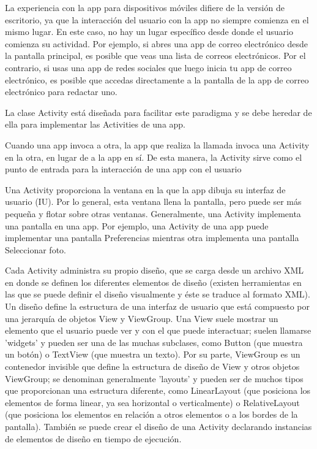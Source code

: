 La experiencia con la app para dispositivos móviles difiere de la versión de escritorio, ya que la interacción del usuario con la app no siempre comienza en el mismo lugar. En este caso, no hay un lugar específico desde donde el usuario comienza su actividad. Por ejemplo, si abres una app de correo electrónico desde la pantalla principal, es posible que veas una lista de correos electrónicos. Por el contrario, si usas una app de redes sociales que luego inicia tu app de correo electrónico, es posible que accedas directamente a la pantalla de la app de correo electrónico para redactar uno.

La clase Activity está diseñada para facilitar este paradigma y se debe heredar de ella para implementar las Activities de una app. 

Cuando una app invoca a otra, la app que realiza la llamada invoca una Activity en la otra, en lugar de a la app en sí. De esta manera, la Activity sirve como el punto de entrada para la interacción de una app con el usuario

Una Activity proporciona la ventana en la que la app dibuja su interfaz de usuario (IU). Por lo general, esta ventana llena la pantalla, pero puede ser más pequeña y flotar sobre otras ventanas. Generalmente, una Activity implementa una pantalla en una app. Por ejemplo, una Activity de una app puede implementar una pantalla Preferencias mientras otra implementa una pantalla Seleccionar foto. 

Cada Activity administra su propio diseño, que se carga desde un archivo XML en donde se definen los diferentes elementos de diseño (existen herramientas en las que se puede definir el diseño visualmente y éste se traduce al formato XML). Un diseño define la estructura de una interfaz de usuario que está compuesto por una jerarquía de objetos View y ViewGroup. Una View suele mostrar un elemento que el usuario puede ver y con el que puede interactuar; suelen llamarse 'widgets' y pueden ser una de las muchas subclases, como Button (que muestra un botón) o TextView (que muestra un texto). Por su parte, ViewGroup es un contenedor invisible que define la estructura de diseño de View y otros objetos ViewGroup; se denominan generalmente 'layouts'  y pueden ser de muchos tipos que proporcionan una estructura diferente, como LinearLayout (que posiciona los elementos de forma linear, ya sea horizontal o verticalmente) o RelativeLayout (que posiciona los elementos en relación a otros elementos o a los bordes de la pantalla).
También se puede crear el diseño de una Activity declarando instancias de elementos de diseño en tiempo de ejecución.

